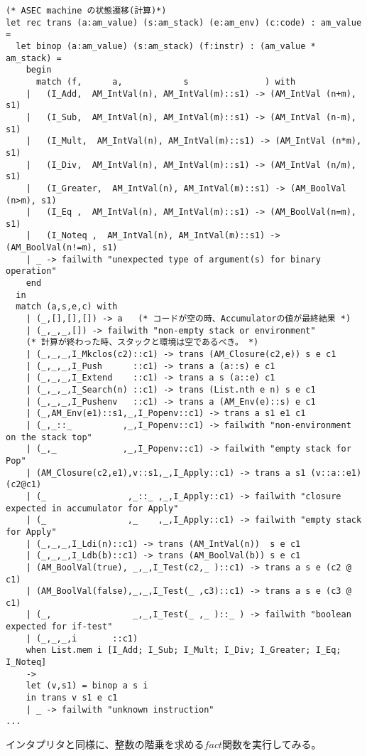 \documentclass[a4paper,9pt]{jsarticle}
\begin{document}
\begin{lstlisting}[caption=am.ml(抜粋)]
(* ASEC machine の状態遷移(計算)*)
let rec trans (a:am_value) (s:am_stack) (e:am_env) (c:code) : am_value =
  let binop (a:am_value) (s:am_stack) (f:instr) : (am_value * am_stack) =
    begin
      match (f,      a,            s               ) with
	|   (I_Add,  AM_IntVal(n), AM_IntVal(m)::s1) -> (AM_IntVal (n+m), s1)
	|   (I_Sub,  AM_IntVal(n), AM_IntVal(m)::s1) -> (AM_IntVal (n-m), s1)
	|   (I_Mult,  AM_IntVal(n), AM_IntVal(m)::s1) -> (AM_IntVal (n*m), s1)
	|   (I_Div,  AM_IntVal(n), AM_IntVal(m)::s1) -> (AM_IntVal (n/m), s1)
	|   (I_Greater,  AM_IntVal(n), AM_IntVal(m)::s1) -> (AM_BoolVal (n>m), s1)
	|   (I_Eq ,  AM_IntVal(n), AM_IntVal(m)::s1) -> (AM_BoolVal(n=m), s1)
	|   (I_Noteq ,  AM_IntVal(n), AM_IntVal(m)::s1) -> (AM_BoolVal(n!=m), s1)
	| _ -> failwith "unexpected type of argument(s) for binary operation"
    end
  in 
  match (a,s,e,c) with 
    | (_,[],[],[]) -> a   (* コードが空の時、Accumulatorの値が最終結果 *)
    | (_,_,_,[]) -> failwith "non-empty stack or environment"  
	(* 計算が終わった時、スタックと環境は空であるべき。 *)
    | (_,_,_,I_Mkclos(c2)::c1) -> trans (AM_Closure(c2,e)) s e c1
    | (_,_,_,I_Push      ::c1) -> trans a (a::s) e c1
    | (_,_,_,I_Extend    ::c1) -> trans a s (a::e) c1
    | (_,_,_,I_Search(n) ::c1) -> trans (List.nth e n) s e c1
    | (_,_,_,I_Pushenv   ::c1) -> trans a (AM_Env(e)::s) e c1
    | (_,AM_Env(e1)::s1,_,I_Popenv::c1) -> trans a s1 e1 c1
    | (_,_::_          ,_,I_Popenv::c1) -> failwith "non-environment on the stack top"
    | (_,_             ,_,I_Popenv::c1) -> failwith "empty stack for Pop"
    | (AM_Closure(c2,e1),v::s1,_,I_Apply::c1) -> trans a s1 (v::a::e1) (c2@c1)
    | (_                ,_::_ ,_,I_Apply::c1) -> failwith "closure expected in accumulator for Apply"
    | (_                ,_    ,_,I_Apply::c1) -> failwith "empty stack for Apply"
    | (_,_,_,I_Ldi(n)::c1) -> trans (AM_IntVal(n))  s e c1
    | (_,_,_,I_Ldb(b)::c1) -> trans (AM_BoolVal(b)) s e c1
    | (AM_BoolVal(true), _,_,I_Test(c2,_ )::c1) -> trans a s e (c2 @ c1)
    | (AM_BoolVal(false),_,_,I_Test(_ ,c3)::c1) -> trans a s e (c3 @ c1)
    | (_,                _,_,I_Test(_ ,_ )::_ ) -> failwith "boolean expected for if-test"
    | (_,_,_,i       ::c1) 
	when List.mem i [I_Add; I_Sub; I_Mult; I_Div; I_Greater; I_Eq; I_Noteq] 
	-> 
	let (v,s1) = binop a s i
	in trans v s1 e c1
    | _ -> failwith "unknown instruction" 
...
\end{lstlisting}

インタプリタと同様に、整数の階乗を求める$fact$関数を実行してみる。
\end{document}
